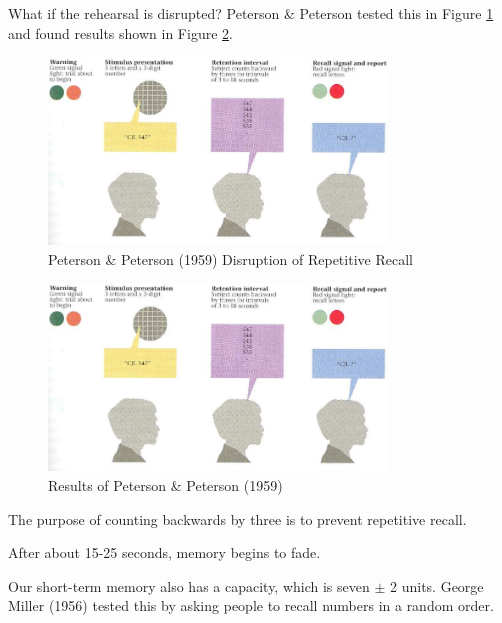 \documentclass[../main/main.tex]{subfiles}
\begin{document}
What if the rehearsal is disrupted? Peterson \& Peterson tested this in Figure \ref{fig:3-5-pet} and found results shown in Figure \ref{fig:3-5-res}.
\begin{figure}[h!]
	    \centering
	    \includegraphics[width=0.8\textwidth]{../images/3-5-pet}
\caption{Peterson \& Peterson (1959) Disruption of Repetitive Recall}
	    \label{fig:3-5-pet}
    \end{figure}
\begin{figure}[h!]
	    \centering
	    \includegraphics[width=0.8\textwidth]{../images/3-5-pet}
\caption{Results of Peterson \& Peterson (1959)}
	    \label{fig:3-5-res}
    \end{figure}
    \begin{remark}
The purpose of counting backwards by three is to prevent repetitive recall.
                                \end{remark}
    \begin{remark}
After about 15-25 seconds, memory begins to fade.
                                \end{remark}
Our short-term memory also has a capacity, which is seven $\pm$ 2 units.
    George Miller (1956) tested this by asking people to recall numbers in a random order.
\end{document}
